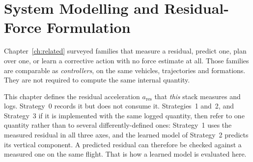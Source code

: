 %
%
%
%

\chapter{System Modelling and Residual-Force Formulation}
\label{ch:model}

Chapter~\ref{ch:related} surveyed families that measure a residual, predict one, plan over one, or
learn a corrective action with no force estimate at all. Those families are comparable as
\emph{controllers}, on the same vehicles, trajectories and formations. They are not required to
compute the same internal quantity.

This chapter defines the residual acceleration $a_{\mathrm{res}}$ that \emph{this} stack measures
and logs. Strategy~0 records it but does not consume it. Strategies~1 and~2, and Strategy~3 if it
is implemented with the same logged quantity, then refer to one quantity rather than to several
differently-defined ones: Strategy~1 uses the measured residual in all three axes, and the learned
model of Strategy~2 predicts its vertical component. A predicted residual can therefore be checked
against a measured one on the same flight. That is how a learned model is evaluated here.

